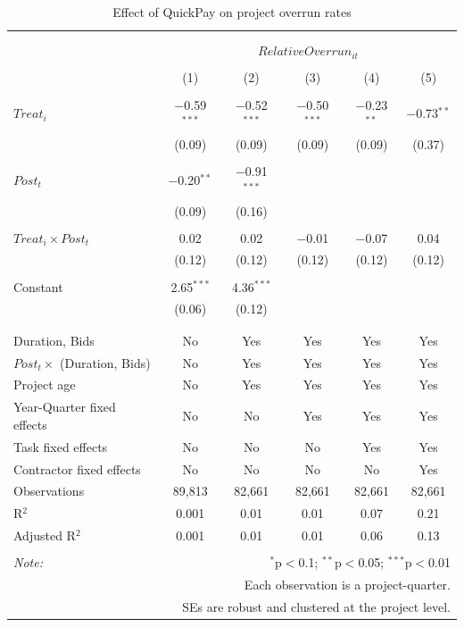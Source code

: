 \documentclass[
]{article}
\begin{document}
\begin{table}[H] \centering 
  \caption{Effect of QuickPay on project overrun rates} 
  \label{} 
\small 
\begin{tabular}{@{\extracolsep{-2pt}}lccccc} 
\\[-1.8ex]\hline 
\hline \\[-1.8ex] 
\\[-1.8ex] & \multicolumn{5}{c}{$RelativeOverrun_{it}$} \\ 
\\[-1.8ex] & (1) & (2) & (3) & (4) & (5)\\ 
\hline \\[-1.8ex] 
 $Treat_i$ & $-$0.59$^{***}$ & $-$0.52$^{***}$ & $-$0.50$^{***}$ & $-$0.23$^{**}$ & $-$0.73$^{**}$ \\ 
  & (0.09) & (0.09) & (0.09) & (0.09) & (0.37) \\ 
  & & & & & \\ 
 $Post_t$ & $-$0.20$^{**}$ & $-$0.91$^{***}$ &  &  &  \\ 
  & (0.09) & (0.16) &  &  &  \\ 
  & & & & & \\ 
 $Treat_i \times Post_t$ & 0.02 & 0.02 & $-$0.01 & $-$0.07 & 0.04 \\ 
  & (0.12) & (0.12) & (0.12) & (0.12) & (0.12) \\ 
  & & & & & \\ 
 Constant & 2.65$^{***}$ & 4.36$^{***}$ &  &  &  \\ 
  & (0.06) & (0.12) &  &  &  \\ 
  & & & & & \\ 
\hline \\[-1.8ex] 
Duration, Bids & No & Yes & Yes & Yes & Yes \\ 
$Post_t \times$  (Duration, Bids) & No & Yes & Yes & Yes & Yes \\ 
Project age & No & Yes & Yes & Yes & Yes \\ 
Year-Quarter fixed effects & No & No & Yes & Yes & Yes \\ 
Task fixed effects & No & No & No & Yes & Yes \\ 
Contractor fixed effects & No & No & No & No & Yes \\ 
Observations & 89,813 & 82,661 & 82,661 & 82,661 & 82,661 \\ 
R$^{2}$ & 0.001 & 0.01 & 0.01 & 0.07 & 0.21 \\ 
Adjusted R$^{2}$ & 0.001 & 0.01 & 0.01 & 0.06 & 0.13 \\ 
\hline 
\hline \\[-1.8ex] 
\textit{Note:}  & \multicolumn{5}{r}{$^{*}$p$<$0.1; $^{**}$p$<$0.05; $^{***}$p$<$0.01} \\ 
 & \multicolumn{5}{r}{Each observation is a project-quarter.} \\ 
 & \multicolumn{5}{r}{SEs are robust and clustered at the project level.} \\ 
\end{tabular} 
\end{table}
\end{document}
